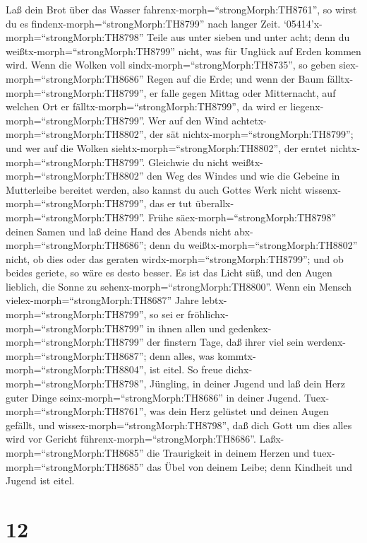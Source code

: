  Laß dein Brot über das Wasser
fahrenx-morph=``strongMorph:TH8761'', so wirst du es
findenx-morph=``strongMorph:TH8799'' nach langer Zeit. 
`05414'\textbar x-morph=``strongMorph:TH8798'' Teile aus unter sieben
und unter acht; denn du weißtx-morph=``strongMorph:TH8799'' nicht, was
für Unglück auf Erden kommen wird.  Wenn die Wolken voll
sindx-morph=``strongMorph:TH8735'', so geben
siex-morph=``strongMorph:TH8686'' Regen auf die Erde; und wenn der Baum
fälltx-morph=``strongMorph:TH8799'', er falle gegen Mittag oder
Mitternacht, auf welchen Ort er fälltx-morph=``strongMorph:TH8799'', da
wird er liegenx-morph=``strongMorph:TH8799''.  Wer auf den
Wind achtetx-morph=``strongMorph:TH8802'', der sät
nichtx-morph=``strongMorph:TH8799''; und wer auf die Wolken
siehtx-morph=``strongMorph:TH8802'', der erntet
nichtx-morph=``strongMorph:TH8799''.  Gleichwie du nicht
weißtx-morph=``strongMorph:TH8802'' den Weg des Windes und wie die
Gebeine in Mutterleibe bereitet werden, also kannst du auch Gottes Werk
nicht wissenx-morph=``strongMorph:TH8799'', das er tut
überallx-morph=``strongMorph:TH8799''.  Frühe
säex-morph=``strongMorph:TH8798'' deinen Samen und laß deine Hand des
Abends nicht abx-morph=``strongMorph:TH8686''; denn du
weißtx-morph=``strongMorph:TH8802'' nicht, ob dies oder das geraten
wirdx-morph=``strongMorph:TH8799''; und ob beides geriete, so wäre es
desto besser.  Es ist das Licht süß, und den Augen lieblich,
die Sonne zu sehenx-morph=``strongMorph:TH8800''.  Wenn ein
Mensch vielex-morph=``strongMorph:TH8687'' Jahre
lebtx-morph=``strongMorph:TH8799'', so sei er
fröhlichx-morph=``strongMorph:TH8799'' in ihnen allen und
gedenkex-morph=``strongMorph:TH8799'' der finstern Tage, daß ihrer viel
sein werdenx-morph=``strongMorph:TH8687''; denn alles, was
kommtx-morph=``strongMorph:TH8804'', ist eitel.  So freue
dichx-morph=``strongMorph:TH8798'', Jüngling, in deiner Jugend und laß
dein Herz guter Dinge seinx-morph=``strongMorph:TH8686'' in deiner
Jugend. Tuex-morph=``strongMorph:TH8761'', was dein Herz gelüstet und
deinen Augen gefällt, und wissex-morph=``strongMorph:TH8798'', daß dich
Gott um dies alles wird vor Gericht
führenx-morph=``strongMorph:TH8686''. 
Laßx-morph=``strongMorph:TH8685'' die Traurigkeit in deinem Herzen und
tuex-morph=``strongMorph:TH8685'' das Übel von deinem Leibe; denn
Kindheit und Jugend ist eitel.

\hypertarget{section-11}{%
\section{12}\label{section-11}}

